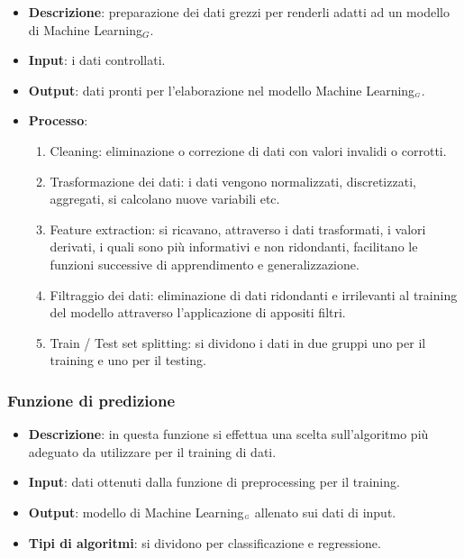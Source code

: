 \begin{itemize}
	\item \textbf{Descrizione}: preparazione dei dati grezzi per renderli adatti ad un modello di Machine Learning$_G$.
	\item \textbf{Input}: i dati controllati.
	\item \textbf{Output}: dati pronti per l'elaborazione nel modello Machine Learning$_{\scaleto{G}{3pt}}$.
	\item \textbf{Processo}: \begin{enumerate}[leftmargin = 2cm]
		\item Cleaning: eliminazione o correzione di dati con valori invalidi o corrotti.
		\item Trasformazione dei dati: i dati vengono normalizzati, discretizzati, aggregati, si calcolano nuove variabili etc.
		\item Feature extraction: si ricavano, attraverso i dati trasformati, i valori derivati, i quali sono più informativi e non ridondanti, facilitano le funzioni successive di apprendimento e generalizzazione.
		\item Filtraggio dei dati: eliminazione di dati ridondanti e irrilevanti al training del modello attraverso l'applicazione di appositi filtri.
		\item Train / Test set splitting: si dividono i dati in due gruppi uno per il training e uno per il testing.
	\end{enumerate}

\end{itemize}

\subsubsection{Funzione di predizione}\label{DescrizioneGeneraleFunzionalitàDelProdottoFunzioneDiElaborazioneDatiFunzioneDiPredizione}

\begin{itemize}
	\item \textbf{Descrizione}: in questa funzione si effettua una scelta sull'algoritmo più adeguato da utilizzare per il training di dati.
	\item \textbf{Input}: dati ottenuti dalla funzione di preprocessing per il training.
	\item \textbf{Output}: modello di Machine Learning$_{\scaleto{G}{3pt}}$ allenato sui dati di input.
	\item \textbf{Tipi di algoritmi}: si dividono per classificazione e regressione.%
\end{itemize}

